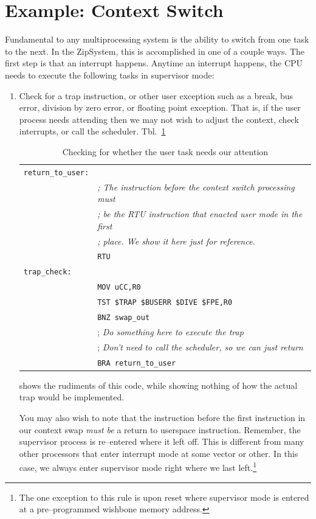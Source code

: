 \documentclass{gqtekspec}
\begin{document}
\section{Example: Context Switch}

Fundamental to any multiprocessing system is the ability to switch from one
task to the next.  In the ZipSystem, this is accomplished in one of a couple
ways.  The first step is that an interrupt happens.  Anytime an interrupt 
happens, the CPU needs to execute the following tasks in supervisor mode:
\begin{enumerate}
\item Check for a trap instruction, or other user exception such as a break,
	bus error, division by zero error, or floating point exception.  That
	is, if the user process needs attending then we may not wish to adjust
	the context, check interrupts, or call the scheduler. 
	Tbl.~\ref{tbl:trap-check}
\begin{table}\begin{center}
\begin{tabular}{ll}
{\tt return\_to\_user:} \\
&	{\em; The instruction before the context switch processing must} \\
&	{\em; be the RTU instruction that enacted user mode in the first} \\
&	{\em; place.  We show it here just for reference.} \\
&	{\tt RTU} \\
{\tt trap\_check:} \\
&	{\tt MOV uCC,R0} \\
&	{\tt TST \$TRAP \textbar \$BUSERR \textbar \$DIVE \textbar \$FPE,R0} \\
&	{\tt BNZ swap\_out} \\
&	{; \em Do something here to execute the trap} \\
&	{; \em Don't need to call the scheduler, so we can just return} \\
&	{\tt BRA return\_to\_user} \\
\end{tabular}
\caption{Checking for whether the user task needs our attention}\label{tbl:trap-check}
\end{center}\end{table}
	shows the rudiments of this code, while showing nothing of how the
	actual trap would be implemented.
	
You may also wish to note that the instruction before the first instruction
in our context swap {\em must be} a return to userspace instruction. 
Remember, the supervisor process is re--entered where it left off.  This is
different from many other processors that enter interrupt mode at some vector
or other.  In this case, we always enter supervisor mode right where we last
left.\footnote{The one exception to this rule is upon reset where supervisor
mode is entered at a pre--programmed wishbone memory address.}


\end{enumerate}
\end{document}
